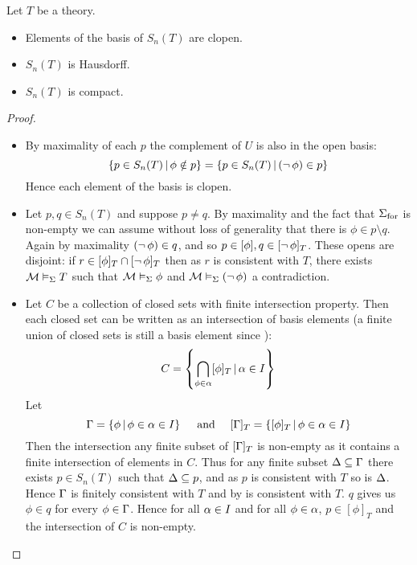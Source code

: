 \begin{prop}
    Let $T$ be a theory.
    \begin{itemize}
        \item Elements of the basis of $S_n(T)$ are clopen.
        \item $S_n(T)$ is Hausdorff.
        \item $S_n(T)$ is compact.
    \end{itemize}
\end{prop}
\begin{proof}~
\begin{itemize}
    \item By maximality of each $p$ the complement of $U$ is also 
        in the open basis:
        \[  
            \left\{p \in S_n(T) \,|\, \phi \notin p\right\}
            = \left\{p \in S_n(T) \,|\, (\neg\, \phi) \in p\right\}
        \]
        Hence each element of the basis is clopen.
    \item Let $p,q \in S_n(T)$ and suppose $p \ne q$. 
        By maximality and the fact that ${\Sigma}_\mathrm{for}$ is non-empty we can assume
        without loss of generality that there is $\phi \in p \setminus q$.
        Again by maximality $(\neg\, \phi) \in q$, 
        and so $p \in [\phi], q \in [\neg\, \phi]_T$.
        These opens are disjoint:
        if $r \in [\phi]_T \cap [\neg\, \phi]_T$ then as 
        $r$ is consistent with $T$, there exists 
        $\mathcal{M} \vDash_{\Sigma} T$ such that 
        $\mathcal{M} \vDash_{\Sigma} \phi$ and $\mathcal{M} \vDash_{\Sigma}(\neg\, \phi)$
        a contradiction. 
    \item Let $C$ be a collection of closed sets with finite intersection
        property.
        Then each closed set can be written as an intersection of
        basis elements (a finite union of closed sets is still a basis element
        since ):
        \[C = \left\{\bigcap_{\phi \in \alpha}[\phi]_T \,|\, \alpha \in I\right\}\]
        Let 
        \[\Gamma = \left\{\phi \,|\, \phi \in \alpha \in I\right\} \quad 
        \text{ and } \quad [\Gamma]_T = \left\{[\phi]_T \,|\, \phi \in \alpha \in I\right\}\]
        Then the intersection any finite subset of $[\Gamma]_T$ is non-empty as it
        contains a finite intersection of elements in $C$.
        Thus for any finite subset $\Delta \subseteq \Gamma$ 
        there exists $p \in S_n(T)$ such that $\Delta \subseteq p$,
        and as $p$ is consistent with $T$ so is $\Delta$.
        Hence $\Gamma$ is finitely consistent with $T$ and by 
         is consistent with $T$.
         $q$ gives us $\phi \in q$ for every $\phi \in \Gamma$.
        Hence for all $\alpha \in I$ and for all $\phi \in \alpha$, $p \in [\phi]_T$
        and the intersection of $C$ is non-empty.
\end{itemize}\end{proof}

